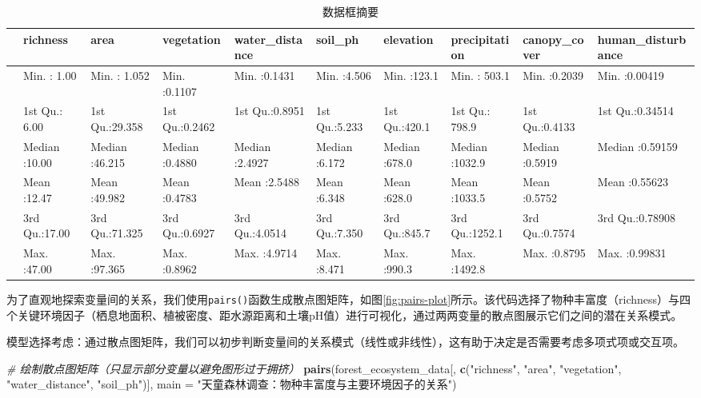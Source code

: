 \documentclass[
  twoside,12pt,fontset=none]{ctexbook}
\newenvironment{Shaded}{\begin{snugshade}}{\end{snugshade}}
\newcommand{\AttributeTok}[1]{\textcolor[rgb]{0.13,0.29,0.53}{#1}}
\newcommand{\CommentTok}[1]{\textcolor[rgb]{0.56,0.35,0.01}{\textit{#1}}}
\newcommand{\FunctionTok}[1]{\textcolor[rgb]{0.13,0.29,0.53}{\textbf{#1}}}
\newcommand{\NormalTok}[1]{#1}
\newcommand{\StringTok}[1]{\textcolor[rgb]{0.31,0.60,0.02}{#1}}
\begin{document}
\begin{table}[!h]
\centering
\caption{\label{tab:data-summary}数据框摘要}
\centering
\begin{tabular}[t]{llllllllll}
\toprule
  &    richness &      area &   vegetation & water\_distance &    soil\_ph &   elevation & precipitation &  canopy\_cover & human\_disturbance\\
\midrule
 & Min.   : 1.00 & Min.   : 1.052 & Min.   :0.1107 & Min.   :0.1431 & Min.   :4.506 & Min.   :123.1 & Min.   : 503.1 & Min.   :0.2039 & Min.   :0.00419\\
 & 1st Qu.: 6.00 & 1st Qu.:29.358 & 1st Qu.:0.2462 & 1st Qu.:0.8951 & 1st Qu.:5.233 & 1st Qu.:420.1 & 1st Qu.: 798.9 & 1st Qu.:0.4133 & 1st Qu.:0.34514\\
 & Median :10.00 & Median :46.215 & Median :0.4880 & Median :2.4927 & Median :6.172 & Median :678.0 & Median :1032.9 & Median :0.5919 & Median :0.59159\\
 & Mean   :12.47 & Mean   :49.982 & Mean   :0.4783 & Mean   :2.5488 & Mean   :6.348 & Mean   :628.0 & Mean   :1033.5 & Mean   :0.5752 & Mean   :0.55623\\
 & 3rd Qu.:17.00 & 3rd Qu.:71.325 & 3rd Qu.:0.6927 & 3rd Qu.:4.0514 & 3rd Qu.:7.350 & 3rd Qu.:845.7 & 3rd Qu.:1252.1 & 3rd Qu.:0.7574 & 3rd Qu.:0.78908\\
\addlinespace
 & Max.   :47.00 & Max.   :97.365 & Max.   :0.8962 & Max.   :4.9714 & Max.   :8.471 & Max.   :990.3 & Max.   :1492.8 & Max.   :0.8795 & Max.   :0.99831\\
\bottomrule
\end{tabular}
\end{table}

为了直观地探索变量间的关系，我们使用\texttt{pairs()}函数生成散点图矩阵，如图\ref{fig:pairs-plot}所示。该代码选择了物种丰富度（richness）与四个关键环境因子（栖息地面积、植被密度、距水源距离和土壤pH值）进行可视化，通过两两变量的散点图展示它们之间的潜在关系模式。

模型选择考虑：通过散点图矩阵，我们可以初步判断变量间的关系模式（线性或非线性），这有助于决定是否需要考虑多项式项或交互项。

\begin{Shaded}
\begin{Highlighting}[]
\CommentTok{\# 绘制散点图矩阵（只显示部分变量以避免图形过于拥挤）}
\FunctionTok{pairs}\NormalTok{(forest\_ecosystem\_data[, }\FunctionTok{c}\NormalTok{(}\StringTok{"richness"}\NormalTok{, }\StringTok{"area"}\NormalTok{, }\StringTok{"vegetation"}\NormalTok{,}
                         \StringTok{"water\_distance"}\NormalTok{, }\StringTok{"soil\_ph"}\NormalTok{)],}
      \AttributeTok{main =} \StringTok{"天童森林调查：物种丰富度与主要环境因子的关系"}\NormalTok{)}
\end{Highlighting}
\end{Shaded}
\end{document}
